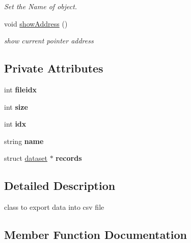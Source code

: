 \begin{DoxyCompactItemize}
\begin{DoxyCompactList}\small\item\em Set the Name of object. \end{DoxyCompactList}\item 
\mbox{\label{classRecorder_ade21528ae33a118fa8ef0a2d1481585f}} 
void \hyperlink{classRecorder_ade21528ae33a118fa8ef0a2d1481585f}{show\+Address} ()
\begin{DoxyCompactList}\small\item\em show current pointer address \end{DoxyCompactList}\end{DoxyCompactItemize}
\subsection*{Private Attributes}
\begin{DoxyCompactItemize}
\item 
\mbox{\label{classRecorder_a9e7bc99c5b525b9ba90b213b9ceb8b0a}} 
int {\bfseries fileidx}
\item 
\mbox{\label{classRecorder_aa462a9878994011343830c7addf84127}} 
int {\bfseries size}
\item 
\mbox{\label{classRecorder_a58cefe30b461b4c1ca3791bef272e388}} 
int {\bfseries idx}
\item 
\mbox{\label{classRecorder_a762c30c53f299264670e969b8fe0004d}} 
string {\bfseries name}
\item 
\mbox{\label{classRecorder_acf45c430df53a77b90b6de1715116770}} 
struct \hyperlink{structdataset}{dataset} $\ast$ {\bfseries records}
\end{DoxyCompactItemize}


\subsection{Detailed Description}
class to export data into csv file 

\subsection{Member Function Documentation}
\mbox{\label{classRecorder_af6314348fd2c47bd074feb6506b6464d}} 
